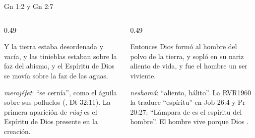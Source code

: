 \begin{frame}{Gn 1:2 y Gn 2:7}
\begin{columns}[t,onlytextwidth]
\begin{column}{0.49\textwidth}
\begin{cita}Y la tierra estaba desordenada y vacía, y las tinieblas estaban sobre la faz del abismo, y el Espíritu de Dios se movía sobre la faz de las aguas.\end{cita}
\begin{center}\end{center}
\scriptsize {} \emph{merajéfet}: ``se cernía'', como el águila sobre sus polluelos (, Dt 32:11). La primera aparición de \emph{rúaj} es el Espíritu de Dios presente en la creación.
\end{column}
\begin{column}{0.49\textwidth}
\begin{cita}Entonces \SENOR{} Dios formó al hombre del polvo de la tierra, y sopló en su nariz aliento de vida, y fue el hombre un ser viviente.\end{cita}
\begin{center}\end{center}
\scriptsize {} \emph{neshamá}: ``aliento, hálito''. La RVR1960 la traduce ``espíritu'' en Job 26:4 y Pr 20:27: ``Lámpara de \SENOR{} es el espíritu del hombre''. El hombre vive porque Dios .
\end{column}
\end{columns}\par\smallskip
{}
\end{frame}

